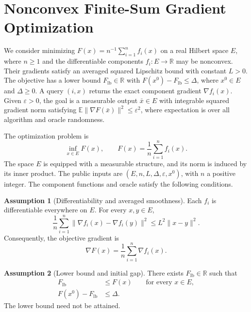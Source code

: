 \documentclass[10pt]{article}
\theoremstyle{definition}
\newtheorem{assumption}{Assumption}
\begin{document}
\section*{Nonconvex Finite-Sum Gradient Optimization}
We consider minimizing $F(x)=n^{-1}\sum_{i=1}^n f_i(x)$ on a real Hilbert space $E$, where $n\geq1$ and the differentiable components $f_i:E\to\mathbb{R}$ may be nonconvex. Their gradients satisfy an averaged squared Lipschitz bound with constant $L>0$. The objective has a lower bound $F_{\mathrm{lb}}\in\mathbb{R}$ with $F(x^0)-F_{\mathrm{lb}}\leq\Delta$, where $x^0\in E$ and $\Delta\geq0$. A query $(i,x)$ returns the exact component gradient $\nabla f_i(x)$. Given $\varepsilon>0$, the goal is a measurable output $\bar{x}\in E$ with integrable squared gradient norm satisfying $\mathbb{E}\|\nabla F(\bar{x})\|^2\leq\varepsilon^2$, where expectation is over all algorithm and oracle randomness.

The optimization problem is
\begin{equation}
\label{eq:problem}
\inf_{x\in E} F(x),
\qquad F(x)=\frac{1}{n}\sum_{i=1}^n f_i(x).
\end{equation}
The space $E$ is equipped with a measurable structure, and its norm is induced by its inner product. The public inputs are $(E,n,L,\Delta,\varepsilon,x^0)$, with $n$ a positive integer. The component functions and oracle satisfy the following conditions.

\begin{assumption}[Differentiability and averaged smoothness]
Each $f_i$ is differentiable everywhere on $E$. For every $x,y\in E$,
\begin{equation}
\frac{1}{n}\sum_{i=1}^n
\|\nabla f_i(x)-\nabla f_i(y)\|^2
\leq L^2\|x-y\|^2.
\end{equation}
Consequently, the objective gradient is
\begin{equation}
\nabla F(x)=\frac{1}{n}\sum_{i=1}^n\nabla f_i(x).
\end{equation}
\end{assumption}

\begin{assumption}[Lower bound and initial gap]
There exists $F_{\mathrm{lb}}\in\mathbb{R}$ such that
\begin{align}
F_{\mathrm{lb}} &\leq F(x) \qquad \text{for every }x\in E,\\
F(x^0)-F_{\mathrm{lb}} &\leq\Delta.
\end{align}
The lower bound need not be attained.
\end{assumption}
\end{document}

